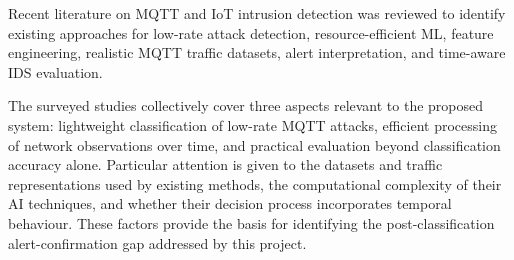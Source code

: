 \documentclass[conference]{IEEEtran}
\begin{document}
Recent literature on MQTT and IoT intrusion detection was reviewed to
identify existing approaches for low-rate attack detection,
resource-efficient ML, feature engineering, realistic MQTT traffic
datasets, alert interpretation, and time-aware IDS evaluation.

The surveyed studies collectively cover three aspects relevant to the
proposed system: lightweight classification of low-rate MQTT attacks,
efficient processing of network observations over time, and practical
evaluation beyond classification accuracy alone. Particular attention
is given to the datasets and traffic representations used by existing
methods, the computational complexity of their AI techniques, and
whether their decision process incorporates temporal behaviour. These
factors provide the basis for identifying the post-classification
alert-confirmation gap addressed by this project.

\end{document}
